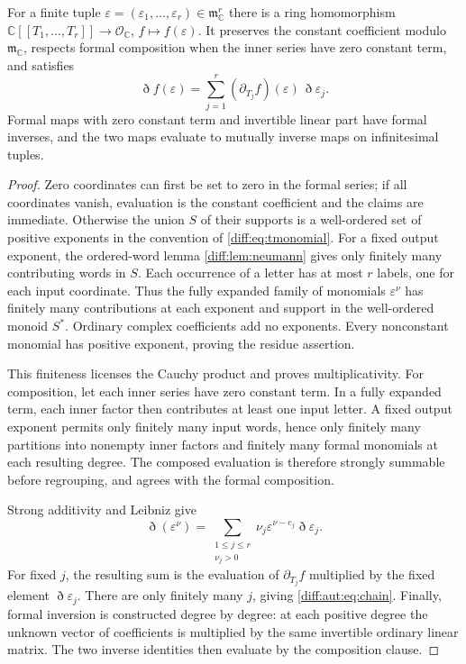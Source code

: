 \documentclass[11pt,letterpaper]{article}
\numberwithin{equation}{section}
\theoremstyle{definition}
\theoremstyle{remark}
\newcommand{\C}{\mathbb C}
\newcommand{\Ofin}{\mathcal O}
\newcommand{\mm}{\mathfrak m}
\newcommand{\Dn}{\eth}
\begin{document}
\begin{lemma}
\label{diff:aut:lem:evaluation}
For a finite tuple $\varepsilon=(\varepsilon_{1},\dots,\varepsilon_{r})\in\mm_{\C}^{r}$
there is a ring homomorphism
$\C[[T_{1},\dots,T_{r}]]\to\Ofin_{\C}$, $f\mapsto f(\varepsilon)$. It preserves the
constant coefficient modulo $\mm_{\C}$, respects formal composition when the
inner series have zero constant term, and satisfies
\begin{equation}\label{diff:aut:eq:chain}
 \Dn f(\varepsilon)=\sum_{j=1}^{r}(\partial_{T_{j}}f)(\varepsilon)\,\Dn\varepsilon_{j}.
\end{equation}
Formal maps with zero constant term and invertible linear part have
formal inverses, and the two maps evaluate to mutually inverse maps on
infinitesimal tuples.
\end{lemma}
\begin{proof}
Zero coordinates can first be set to zero in the formal series; if
all coordinates vanish, evaluation is the constant coefficient and the
claims are immediate. Otherwise the union $S$ of their supports is a
well-ordered set of positive exponents in the convention of
\cref{diff:eq:tmonomial}. For a fixed output exponent, the ordered-word
lemma \cref{diff:lem:neumann} gives only finitely many contributing
words in $S$. Each occurrence of a letter has at most $r$ labels,
one for each input coordinate. Thus the fully expanded family of
monomials $\varepsilon^\nu$ has finitely many contributions at each
exponent and support in the well-ordered monoid $S^*$. Ordinary
complex coefficients add no exponents. Every nonconstant monomial has
positive exponent, proving the residue assertion.

This finiteness licenses the Cauchy product and proves
multiplicativity. For composition, let each inner series have zero
constant term. In a fully expanded term, each inner factor then
contributes at least one input letter. A fixed output exponent permits
only finitely many input words, hence only finitely many partitions
into nonempty inner factors and finitely many formal monomials at
each resulting degree. The composed evaluation is therefore strongly
summable before regrouping, and agrees with the formal composition.

Strong additivity and Leibniz give
\[
 \Dn(\varepsilon^\nu)=
 \sum_{\substack{1\leq j\leq r\\\nu_j>0}}
       \nu_j\varepsilon^{\nu-e_j}\Dn\varepsilon_j.
\]
For fixed $j$, the resulting sum is the evaluation of
$\partial_{T_j}f$ multiplied by the fixed element
$\Dn\varepsilon_j$. There are only finitely many $j$, giving
\cref{diff:aut:eq:chain}. Finally, formal inversion is constructed
degree by degree: at each positive degree the unknown vector of
coefficients is multiplied by the same invertible ordinary linear
matrix. The two inverse identities then evaluate by the composition
clause.
\end{proof}
\end{document}

